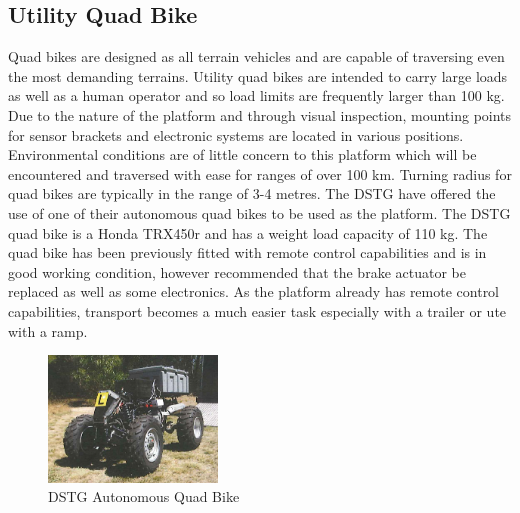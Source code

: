 \documentclass[main.tex]{subfiles}
\begin{document}
\subsection{Utility Quad Bike}
Quad bikes are designed as all terrain vehicles and are capable of traversing even the most demanding terrains. Utility quad bikes are intended to carry large loads as well as a human operator and so load limits are frequently larger than 100 kg. Due to the nature of the platform and through visual inspection, mounting points for sensor brackets and electronic systems are located in various positions.  Environmental conditions are of little concern to this platform which will be encountered and traversed with ease for ranges of over 100 km. Turning radius for quad bikes are typically in the range of 3-4 metres.
The DSTG have offered the use of one of their autonomous quad bikes to be used as the platform. The DSTG quad bike is a Honda TRX450r and has a weight load capacity of 110 kg. The quad bike has been previously fitted with remote control capabilities and is in good working condition, however \textcite{scheiner2011} recommended that the brake actuator be replaced as well as some electronics. As the platform already has remote control capabilities, transport becomes a much easier task especially with a trailer or ute with a ramp.
\begin{figure}[ht]
\includegraphics[width=0.4\textwidth]{4-ConceptDesign/2011quadbike.PNG}
\centering
\caption[DSTG Autonomous Quad Bike]{DSTG Autonomous Quad Bike \parencite{scheiner2011}} 
\end{figure}
\end{document}
